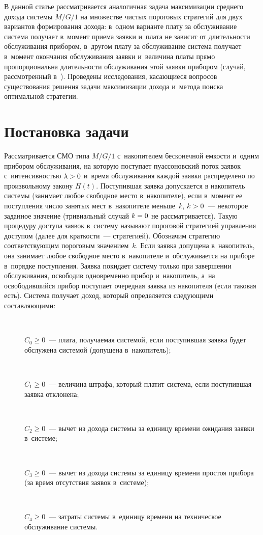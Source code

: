 \begin{multicols}{2}
  В данной статье рассматривается аналогичная задача максимизации среднего 
дохода системы $M/G/1$ на множестве чистых пороговых стратегий для двух 
вариантов формирования дохода: в~одном варианте плату за обслуживание 
система получает в~момент приема заявки и~плата не зависит от длительности 
обслуживания прибором, в~другом плату за обслуживание система получает 
в~момент окончания обслуживания заявки и~величина платы прямо 
пропорциональна длительности обслуживания этой заявки прибором (случай, 
рассмотренный в~\cite{7-ag}). Проведены исследования, касающиеся вопросов 
существования решения задачи максимизации дохода и~метода поиска 
оптимальной стратегии.
{

}

\vspace*{-6pt}
  
\section{Постановка задачи}

  Рассматривается СМО типа $M/G/1$ с~накопителем бесконечной емкости 
и~одним прибором обслуживания, на которую поступает пуассоновский поток 
заявок с~интенсивностью $\lambda\hm>0$ и~время обслуживания каждой заявки 
распределено по произвольному закону $H(t)$. Поступившая заявка допускается 
в накопитель системы (занимает любое свободное место в~накопителе), если 
в~момент ее поступления число занятых мест в~накопителе меньше~$k$, 
$k\hm>0$~--- некоторое заданное значение (тривиальный случай $k\hm=0$ не 
рассматривается). Такую процедуру доступа заявок в~систему называют 
пороговой стратегией управления доступом (далее для краткости~--- 
стратегией). Обозначим стратегию соответствующим пороговым 
значением~$k$. Если заявка допущена в~накопитель, она занимает любое 
свободное место в~накопителе и~обслуживается на приборе в~порядке 
поступления. Заявка покидает систему только при завершении обслуживания, 
освободив одновременно прибор и~накопитель, а~на освободившийся прибор 
поступает очередная заявка из накопителя (если таковая есть). Система 
получает доход, который определяется следующими составляющими:
  \begin{description}
\item[\,]  $C_0\geq 0$~--- плата, получаемая системой, если поступившая заявка будет 
обслужена системой (допущена в~накопитель); 
\item[\,]  
  $C_1\geq 0$~--- величина штрафа, который платит сис\-те\-ма, если 
поступившая заявка отклонена;
  \item[\,]
  $C_2\geq 0$~--- вычет из дохода сис\-те\-мы за единицу времени ожидания 
заявки в~сис\-теме;
  \item[\,]
  $C_3\geq 0$~--- вычет из дохода сис\-те\-мы за единицу времени простоя 
прибора (за время отсутствия заявок в~сис\-теме);
  \item[\,]
  $C_4\geq 0$~--- затраты сис\-те\-мы в~единицу времени на техническое 
обслуживание сис\-темы. 
  \end{description}
  

\end{multicols}
